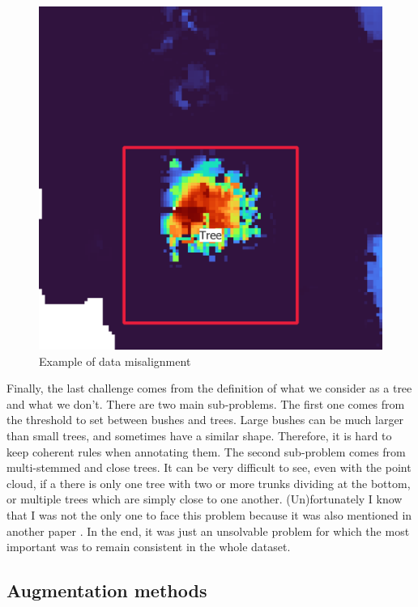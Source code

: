 \documentclass[
  letterpaper,
  DIV=11,
  numbers=noendperiod]{scrartcl}
\begin{document}
\begin{figure}
\begin{minipage}{0.48\linewidth}
\includegraphics{images/Data_shift/CHM_all_color.png}

\end{minipage}%

\caption{\label{fig-dataset-gt-boxes}Example of data misalignment}

\end{figure}%

Finally, the last challenge comes from the definition of what we
consider as a tree and what we don't. There are two main sub-problems.
The first one comes from the threshold to set between bushes and trees.
Large bushes can be much larger than small trees, and sometimes have a
similar shape. Therefore, it is hard to keep coherent rules when
annotating them. The second sub-problem comes from multi-stemmed and
close trees. It can be very difficult to see, even with the point cloud,
if a there is only one tree with two or more trunks dividing at the
bottom, or multiple trees which are simply close to one another.
(Un)fortunately I know that I was not the only one to face this problem
because it was also mentioned in another paper
\autocite{DeepForestBefore}. In the end, it was just an unsolvable
problem for which the most important was to remain consistent in the
whole dataset.

\subsection{Augmentation methods}\label{augmentation-methods}
\end{document}
